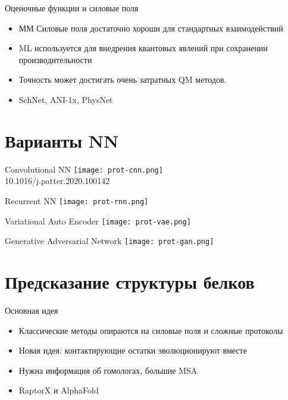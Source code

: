 \begin{frame}{Оценочные функции и силовые поля}
    \begin{itemize}
        \item ММ Силовые поля достаточно хороши для стандартных  взаимодействий
        \item ML используется для внедрения квантовых явлений при сохранении производительности
        \item Точность может достигать очень затратных QM методов.
        \item SchNet, ANI-1x, PhysNet
    \end{itemize}
\end{frame}


\section{Варианты NN }
\begin{frame}{Convolutional NN}
\centering
 \texttt{[image: prot-cnn.png]}\\
 \footnotesize 10.1016/j.patter.2020.100142
    \end{frame}


\begin{frame}{Recurrent NN}
\centering
 \texttt{[image: prot-rnn.png]}
    \end{frame}


\begin{frame}{Variational Auto Encoder}
\centering
 \texttt{[image: prot-vae.png]}
    \end{frame}

\begin{frame}{ Generative Adversarial Network}
\centering
 \texttt{[image: prot-gan.png]}
    \end{frame}


\section{Предсказание структуры белков}

\begin{frame}{Основная идея}
    \begin{itemize}
        \item Классические методы опираются на силовые поля и сложные протоколы
        \item Новая идея: контактирующие остатки эволюционируют вместе
        \item Нужна информация об гомологах, большие MSA
        \item RaptorX и AlphaFold
    \end{itemize}
\end{frame}

